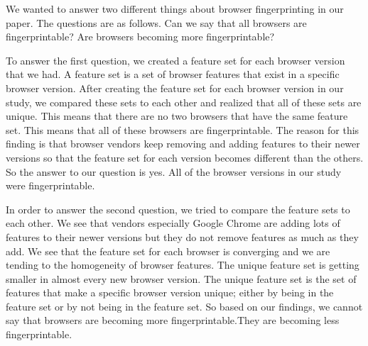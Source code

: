We wanted to answer two different things about browser fingerprinting in our paper. The questions are as follows. Can we say that all browsers are fingerprintable? Are browsers becoming more fingerprintable?

To answer the first question, we created a feature set for each browser version that we had. A feature set is a set of browser features that exist in a specific browser version. After creating the feature set for each browser version in our study, we compared these sets to each other and realized that all of these sets are unique. This means that there are no two browsers that have the same feature set. This means that all of these browsers are fingerprintable. The reason for this finding is that browser vendors keep removing and adding features to their newer versions so that the feature set for each version becomes different than the others. So the answer to our question is yes. All of the browser versions in our study were fingerprintable.

In order to answer the second question, we tried to compare the feature sets to each other. We see that vendors especially Google Chrome are adding lots of features to their newer versions but they do not remove features as much as they add. We see that the feature set for each browser is converging and we are tending to the homogeneity of browser features. The unique feature set is getting smaller in almost every new browser version. The unique feature set is the set of features that make a specific browser version unique; either by being in the feature set or by not being in the feature set. 
So based on our findings, we cannot say that browsers are becoming more fingerprintable.They are becoming less fingerprintable.




